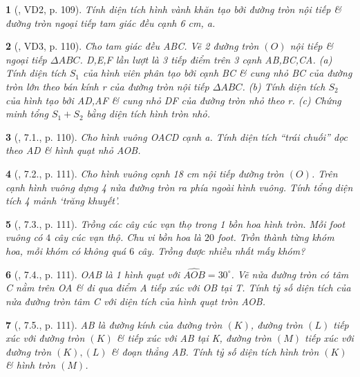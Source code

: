 \documentclass{article}
\newtheorem{baitoan}{}
\begin{document}
\begin{baitoan}[\cite{Binh_boi_duong_Toan_9_tap_2}, VD2, p. 109]
	Tính diện tích hình vành khăn tạo bởi đường tròn nội tiếp \& đường tròn ngoại tiếp tam giác đều cạnh {\rm6 cm}, a.
\end{baitoan}

\begin{baitoan}[\cite{Binh_boi_duong_Toan_9_tap_2}, VD3, p. 110]
	Cho tam giác đều ABC. Vẽ 2 đường tròn $(O)$ nội tiếp \& ngoại tiếp $\Delta ABC$. D,E,F lần lượt là 3 tiếp điểm trên 3 cạnh AB,BC,CA. (a) Tính diện tích $S_1$ của hình viên phân tạo bởi cạnh BC \& cung nhỏ BC của đường tròn lớn theo bán kính r của đường tròn nội tiếp $\Delta ABC$. (b) Tính diện tích $S_2$ của hình tạo bởi AD,AF \& cung nhỏ DF của đường tròn nhỏ theo r. (c) Chứng minh tổng $S_1 + S_2$ bằng diện tích hình tròn nhỏ.
\end{baitoan}

\begin{baitoan}[\cite{Binh_boi_duong_Toan_9_tap_2}, 7.1., p. 110]
	Cho hình vuông OACD cạnh a. Tính diện tích ``trái chuối'' dọc theo AD \& hình quạt nhỏ AOB.
\end{baitoan}

\begin{baitoan}[\cite{Binh_boi_duong_Toan_9_tap_2}, 7.2., p. 111]
	Cho hình vuông cạnh {\rm18 cm} nội tiếp đường tròn $(O)$. Trên cạnh hình vuông dựng 4 nửa đường tròn ra phía ngoài hình vuông. Tính tổng diện tích 4 mảnh `trăng khuyết'.
\end{baitoan}

\begin{baitoan}[\cite{Binh_boi_duong_Toan_9_tap_2}, 7.3., p. 111]
	Trồng các cây cúc vạn thọ trong 1 bồn hoa hình tròn. Mỗi foot vuông có $4$ cây cúc vạn thộ. Chu vi bồn hoa là $20$ foot. Trồn thành từng khóm hoa, mỗi khóm có không quá $6$ cây. Trồng được nhiều nhất mấy khóm?
\end{baitoan}

\begin{baitoan}[\cite{Binh_boi_duong_Toan_9_tap_2}, 7.4., p. 111]
	OAB là 1 hình quạt với $\widehat{AOB} = 30^\circ$. Vẽ nửa đường tròn có tâm C nằm trên OA \& đi qua điểm A tiếp xúc với OB tại T. Tính tỷ số diện tích của nửa đường tròn tâm C với diện tích của hình quạt tròn AOB.
\end{baitoan}

\begin{baitoan}[\cite{Binh_boi_duong_Toan_9_tap_2}, 7.5., p. 111]
	AB là đường kính của đường tròn $(K)$, đường tròn $(L)$ tiếp xúc với đường tròn $(K)$ \& tiếp xúc với AB tại K, đường tròn $(M)$ tiếp xúc với đường tròn $(K),(L)$ \& đoạn thẳng AB. Tính tỷ số diện tích hình tròn $(K)$ \& hình tròn $(M)$.
\end{baitoan}
\end{document}
